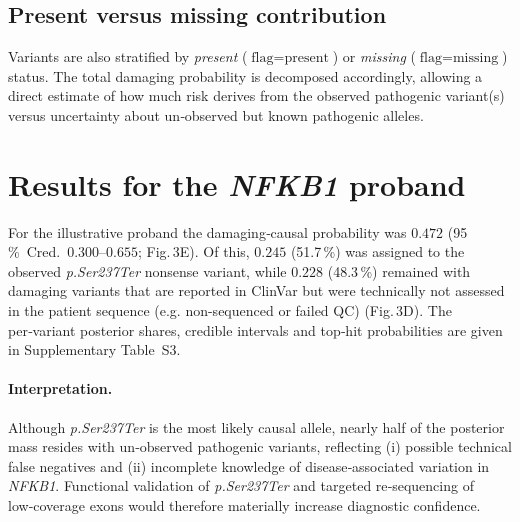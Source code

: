 \subsection{Present versus missing contribution}

Variants are also stratified by
\textit{present} ($\text{flag}=\text{present}$) or
\textit{missing} ($\text{flag}=\text{missing}$) status.
The total damaging probability is decomposed accordingly,
allowing a direct estimate of how much risk derives from the
observed pathogenic variant(s) versus uncertainty about un‑observed but
known pathogenic alleles.


\section{Results for the \textit{NFKB1} proband}

For the illustrative proband the damaging‑causal probability was
$0.472$ (95\,\%~Cred.\ $0.300$–$0.655$;
Fig.\,3E).  Of this, $0.245$ (51.7\,\%) was assigned to the observed
\textit{p.Ser237Ter} nonsense variant, while $0.228$
(48.3\,\%) remained with damaging variants that are reported in
ClinVar but were technically not assessed in the patient sequence (e.g. non-sequenced or failed QC)
(Fig.\,3D).  The per‑variant posterior shares, credible intervals and
top‑hit probabilities are given in Supplementary Table~S3.

\paragraph{Interpretation.}
Although \textit{p.Ser237Ter} is the most likely causal allele, nearly half of the
posterior mass resides with un‑observed pathogenic variants, reflecting (i)
possible technical false negatives and (ii) incomplete knowledge of
disease‑associated variation in \textit{NFKB1}.  Functional validation of
\textit{p.Ser237Ter} and targeted re‑sequencing of low‑coverage exons would
therefore materially increase diagnostic confidence.


\FloatBarrier





